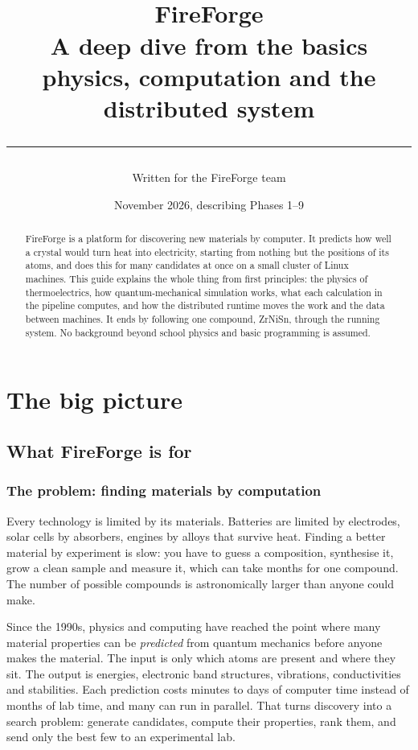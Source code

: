 \documentclass[11pt,a4paper]{report}
\title{\vspace*{-2cm}{\color{forge}\rule{\linewidth}{2pt}}\\[10pt]
  {\Huge\bfseries FireForge}\\[6pt]
  {\Large A deep dive from the basics}\\[4pt]
  {\large physics, computation and the distributed system}\\
  {\color{forge}\rule{\linewidth}{1pt}}}
\author{Written for the FireForge team}
\date{November 2026, describing Phases 1--9}
\begin{document}
\maketitle

\begin{abstract}
FireForge is a platform for discovering new materials by computer. It predicts how well a
crystal would turn heat into electricity, starting from nothing but the positions of its
atoms, and does this for many candidates at once on a small cluster of Linux machines.
This guide explains the whole thing from first principles: the physics of thermoelectrics,
how quantum-mechanical simulation works, what each calculation in the pipeline computes,
and how the distributed runtime moves the work and the data between machines. It ends by
following one compound, ZrNiSn, through the running system. No background beyond
school physics and basic programming is assumed.
\end{abstract}

\tableofcontents

\part{The big picture}

\chapter{What FireForge is for}

\section{The problem: finding materials by computation}

Every technology is limited by its materials. Batteries are limited by electrodes, solar
cells by absorbers, engines by alloys that survive heat. Finding a better material by
experiment is slow: you have to guess a composition, synthesise it, grow a clean sample and
measure it, which can take months for one compound. The number of possible compounds is
astronomically larger than anyone could make.

Since the 1990s, physics and computing have reached the point where many material
properties can be \emph{predicted} from quantum mechanics before anyone makes the material.
The input is only which atoms are present and where they sit. The output is energies,
electronic band structures, vibrations, conductivities and stabilities. Each prediction
costs minutes to days of computer time instead of months of lab time, and many can run in
parallel. That turns discovery into a search problem: generate candidates, compute their
properties, rank them, and send only the best few to an experimental lab.
\end{document}
